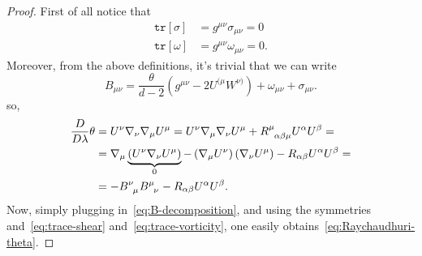 \begin{proof}
	First of all notice that 
	\begin{align}
		\label{eq:trace-shear}
		\texttt{tr}[\sigma] &= g^{\mu\nu}\sigma_{\mu\nu} = 0\\
		\label{eq:trace-vorticity}
		\texttt{tr}[\omega] &= g^{\mu\nu}\omega_{\mu\nu} = 0.
	\end{align}	
	Moreover, from the above definitions, it's trivial that we can write
	\begin{equation}
	\label{eq:B-decomposition}
		B_{\mu\nu} = \frac{\theta}{d - 2} \left(g^{\mu\nu} - 2U^{(\mu}W^{\nu)}\right) +\omega_{\mu\nu} + \sigma_{\mu\nu}.
	\end{equation}
	so,
	\begin{align*}
		\frac{D}{D\lambda}\theta &= U^{\nu}\nabla_{\nu}\nabla_{\mu}U^{\mu} = U^{\nu}\nabla_{\mu}\nabla_{\nu}U^{\mu} + R\indices{^{\mu}_{\alpha\beta\mu}}U^{\alpha}U^{\beta} =\\
		&= \nabla_{\mu}\underbrace{\left(U^{\nu}\nabla_{\nu}U^{\mu}\right)}_{0} - \left(\nabla_{\mu}U^{\nu}\right)\left(\nabla_{\nu}U^{\mu}\right) - R_{\alpha\beta}U^{\alpha}U^{\beta} =\\
		&= - B\indices{^{\nu}_{\mu}}B\indices{^{\mu}_{\nu}} - R_{\alpha\beta}U^{\alpha}U^{\beta}.
	\end{align*}
	Now, simply plugging in~\eqref{eq:B-decomposition}, and using the symmetries and~\eqref{eq:trace-shear} and~\eqref{eq:trace-vorticity}, one easily obtains~\eqref{eq:Raychaudhuri-theta}.
		

\end{proof}
